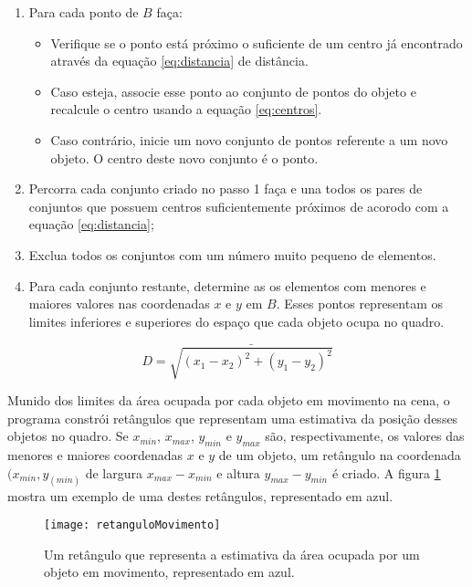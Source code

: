 \begin{enumerate}
\item Para cada ponto de $B$ faça: 
	\begin{itemize}
		\item Verifique se o ponto está próximo o suficiente de um centro já 				encontrado através da equação \ref{eq:distancia} de distância.
		\item Caso esteja, associe esse ponto ao conjunto de pontos do objeto e 			recalcule o centro usando a equação \ref{eq:centros}. 
		\item Caso contrário, inicie um novo conjunto de pontos referente a um 				novo objeto. O centro deste novo conjunto é o ponto.
	\end{itemize}

\item Percorra cada conjunto criado no passo 1 faça e una todos os pares de conjuntos que possuem centros suficientemente próximos de acorodo com a equação \ref{eq:distancia};

\item Exclua todos os conjuntos com um número muito pequeno de elementos.

\item Para cada conjunto restante, determine as os elementos com menores e maiores valores nas coordenadas $x$ e $y$ em $B$. Esses pontos representam os limites inferiores e superiores do espaço que cada objeto ocupa no quadro.
\end{enumerate}

\begin{equation}
D = \bar{\sqrt{(x_1-x_2)^2+(y_1-y_2)^2}}
\label{eq:distancia}
\end{equation}

Munido dos limites da área ocupada por cada objeto em movimento na cena, o programa constrói retângulos que representam uma estimativa da posição desses objetos no quadro. Se $x_{min}$, $x_{max}$, $y_{min}$ e $y_{max}$ são, respectivamente, os valores das menores e maiores coordenadas $x$ e $y$ de um objeto, um retângulo na coordenada $(x_{min},y_(min)$ de largura $x_{max}-x_{min}$ e altura $y_{max}-y_{min}$ é criado. A figura \ref{fig:retanguloMovimento} mostra um exemplo de uma destes retângulos, representado em azul.

\begin{figure}
\centering
\texttt{[image: retanguloMovimento]}
\centering
\caption{Um retângulo que representa a estimativa da área ocupada por um objeto em movimento, representado em azul.}
\label{fig:retanguloMovimento}
\end{figure}

